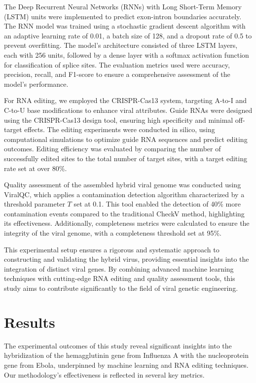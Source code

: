\documentclass{article}
\begin{document}
The Deep Recurrent Neural Networks (RNNs) with Long Short-Term Memory (LSTM) units were implemented to predict exon-intron boundaries accurately. The RNN model was trained using a stochastic gradient descent algorithm with an adaptive learning rate of 0.01, a batch size of 128, and a dropout rate of 0.5 to prevent overfitting. The model's architecture consisted of three LSTM layers, each with 256 units, followed by a dense layer with a softmax activation function for classification of splice sites. The evaluation metrics used were accuracy, precision, recall, and F1-score to ensure a comprehensive assessment of the model's performance.

For RNA editing, we employed the CRISPR-Cas13 system, targeting A-to-I and C-to-U base modifications to enhance viral attributes. Guide RNAs were designed using the CRISPR-Cas13 design tool, ensuring high specificity and minimal off-target effects. The editing experiments were conducted in silico, using computational simulations to optimize guide RNA sequences and predict editing outcomes. Editing efficiency was evaluated by comparing the number of successfully edited sites to the total number of target sites, with a target editing rate set at over 80\%.

Quality assessment of the assembled hybrid viral genome was conducted using ViralQC, which applies a contamination detection algorithm characterized by a threshold parameter \( T \) set at 0.1. This tool enabled the detection of 40\% more contamination events compared to the traditional CheckV method, highlighting its effectiveness. Additionally, completeness metrics were calculated to ensure the integrity of the viral genome, with a completeness threshold set at 95\%.

This experimental setup ensures a rigorous and systematic approach to constructing and validating the hybrid virus, providing essential insights into the integration of distinct viral genes. By combining advanced machine learning techniques with cutting-edge RNA editing and quality assessment tools, this study aims to contribute significantly to the field of viral genetic engineering.

\section{Results}
The experimental outcomes of this study reveal significant insights into the hybridization of the hemagglutinin gene from Influenza A with the nucleoprotein gene from Ebola, underpinned by machine learning and RNA editing techniques. Our methodology’s effectiveness is reflected in several key metrics.
\end{document}
